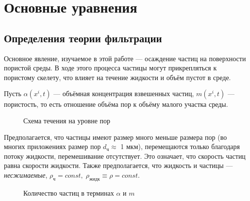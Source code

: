 \section{Основные уравнения}

\subsection{Определения теории фильтрации}

\par Основное явление, изучаемое в этой работе --- осаждение частиц на поверхности пористой среды. В ходе этого процесса частицы могут прикрепляться к пористому скелету, что влияет на течение жидкости и объём пустот в среде.\\
\par Пусть $\alpha(x^{i},t)$ --- объёмная концентрация взвешенных частиц, $m(x^{i},t)$ --- пористость, то есть отношение объёма пор к объёму малого участка среды.\\
\begin{figure}[h!]
\caption{Схема течения на уровне пор}
\label{fig:image1}
\end{figure}
\par Предполагается, что частицы имеют размер много меньше размера пор (во многих приложениях размер пор $d_{\text{ч}}\approx$ 1 мкм), перемещаются только благодаря потоку жидкости, перемешивание отсутствует. Это означает, что скорость частиц равна скорости жидкости. Также предполагается, что жидкость и частицы --- \textit{несжимаемые}, $\rho_{\text{ч}} = const, \; \rho_{\text{жидк}}\equiv\rho = const$.

\begin{figure}[h!]
\caption{Количество частиц в терминах $\alpha$ и $m$}
\label{fig:image2}
\end{figure}


